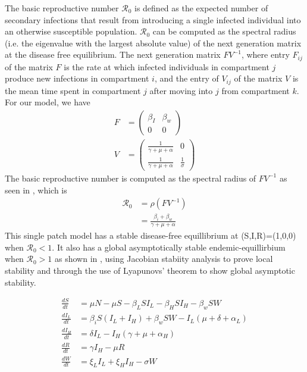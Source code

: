 \documentclass[12pt]{article}\usepackage[]{graphicx}\usepackage[]{color}
\begin{document}
The basic reproductive number ${\mathcal R_0}$ is defined as the expected number of secondary infections that result from introducing a single infected individual into an otherwise susceptible
population.
${\mathcal R_0}$ can be computed as the spectral radius (i.e. the eigenvalue with the largest absolute value) of the next generation matrix at the disease free equilibrium.
The next generation matrix $FV^{−1}$, where entry $F_{ij}$ of the matrix $F$ is the rate at which infected individuals in compartment $j$ produce new infections in compartment $i$, and the entry of $V_{ij}$ of the matrix $V$ is the mean time spent in compartment $j$ after moving into $j$ from compartment $k$.
For our model, we have
\begin{align*}
		F&=\begin{pmatrix}
			\beta_I & \beta_w\\
			0 & 0
			\end{pmatrix}\\
		V&=\begin{pmatrix}
			\frac{1}{\gamma+\mu+\alpha} & 0\\
			\frac{1}{\gamma+\mu+\alpha} &\frac{1}{\sigma}
			\end{pmatrix}
\end{align*}
The basic reproductive number is computed as the spectral radius of $FV^{-1}$ as seen in \cite{link9}, which is
\begin{align*}
    {\mathcal R_0} &= \rho(FV^{-1})\\
		           &=\frac{\beta_i+\beta_w}{\gamma+\mu+\alpha}
\end{align*}
This single patch model has a stable disease-free equillibrium at (S,I,R)=(1,0,0) when ${\mathcal R_0}<1$.
It also has a global asymptotically stable endemic-equillirbium when ${\mathcal R_0}>1$ as shown in \cite{link9}, using Jacobian stabiity
analysis to prove local stability and through the use of Lyapunovs' theorem to show global asymptotic stability.


\begin{align*}
	\frac{dS}{dt}&= \mu N - \mu S - \beta_L S I_L - \beta_H S I_H - \beta_w S W  \\
	\frac{dI_L}{dt}&= \beta_i S( I_L + I_H) + \beta_w S W - I_L (\mu + \delta + \alpha_L) \\
	\frac{dI_H}{dt}&= \delta I_L - I_H (\gamma + \mu + \alpha_H) \\
	\frac{dR}{dt}&= \gamma I_H - \mu R \\
	\frac{dW}{dt}&= \xi_L I_L + \xi_H I_H  - \sigma W\\
	\end{align*}
\end{document}
